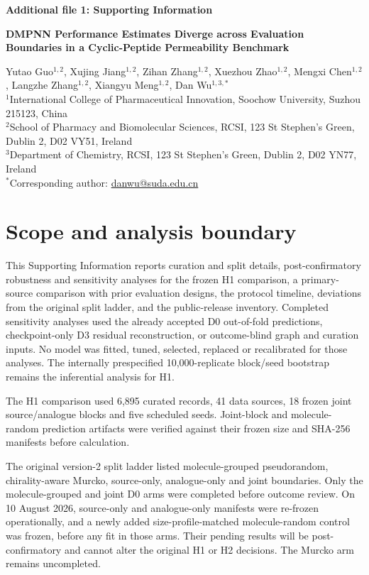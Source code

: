 \documentclass[10pt]{article}
\begin{document}
\begin{center}
{\Large\bfseries Additional file 1: Supporting Information\par}
\vspace{0.6em}
{\large\bfseries DMPNN Performance Estimates Diverge across Evaluation Boundaries in a Cyclic-Peptide Permeability Benchmark\par}
\vspace{0.8em}
Yutao Guo$^{1,2}$, Xujing Jiang$^{1,2}$, Zihan Zhang$^{1,2}$, Xuezhou Zhao$^{1,2}$, Mengxi Chen$^{1,2}$, Langzhe Zhang$^{1,2}$, Xiangyu Meng$^{1,2}$, Dan Wu$^{1,3,*}$\\
\vspace{0.35em}
\small $^{1}$International College of Pharmaceutical Innovation, Soochow University, Suzhou 215123, China\\
$^{2}$School of Pharmacy and Biomolecular Sciences, RCSI, 123 St Stephen's Green, Dublin 2, D02 VY51, Ireland\\
$^{3}$Department of Chemistry, RCSI, 123 St Stephen's Green, Dublin 2, D02 YN77, Ireland\\
$^{*}$Corresponding author: \href{mailto:danwu@suda.edu.cn}{danwu@suda.edu.cn}
\end{center}

\section*{Scope and analysis boundary}

This Supporting Information reports curation and split details, post-confirmatory robustness and sensitivity analyses for the frozen H1 comparison, a primary-source comparison with prior evaluation designs, the protocol timeline, deviations from the original split ladder, and the public-release inventory. Completed sensitivity analyses used the already accepted D0 out-of-fold predictions, checkpoint-only D3 residual reconstruction, or outcome-blind graph and curation inputs. No model was fitted, tuned, selected, replaced or recalibrated for those analyses. The internally prespecified 10,000-replicate block/seed bootstrap remains the inferential analysis for H1.

The H1 comparison used 6,895 curated records, 41 data sources, 18 frozen joint source/analogue blocks and five scheduled seeds. Joint-block and molecule-random prediction artifacts were verified against their frozen size and SHA-256 manifests before calculation.

The original version-2 split ladder listed molecule-grouped pseudorandom, chirality-aware Murcko, source-only, analogue-only and joint boundaries. Only the molecule-grouped and joint D0 arms were completed before outcome review. On 10 August 2026, source-only and analogue-only manifests were re-frozen operationally, and a newly added size-profile-matched molecule-random control was frozen, before any fit in those arms. Their pending results will be post-confirmatory and cannot alter the original H1 or H2 decisions. The Murcko arm remains uncompleted.
\end{document}
